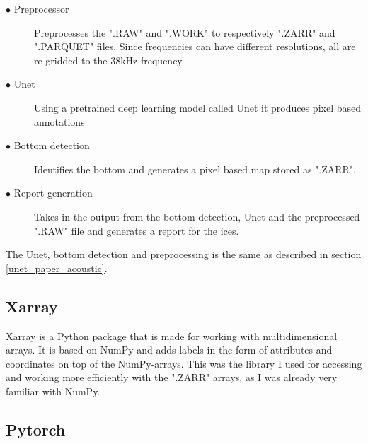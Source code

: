             \begin{description}
              \item[$\bullet$ Preprocessor] Preprocesses the ".RAW" and ".WORK" to respectively ".ZARR" and ".PARQUET" files. Since frequencies can have different resolutions, all are re-gridded to the 38kHz frequency.
              \item[$\bullet$ Unet] Using a pretrained deep learning model called Unet it produces pixel based annotations
              \item[$\bullet$ Bottom detection] Identifies the bottom and generates a pixel based map stored as ".ZARR".
              \item[$\bullet$ Report generation] Takes in the output from the bottom detection, Unet and the preprocessed ".RAW" file and generates a report for the \gls{ices}.
    
            \end{description}

        The Unet, bottom detection and preprocessing is the same as described in section \ref{unet_paper_acoustic}.

    \subsection{Xarray}
        Xarray\cite{xarray} is a Python package that is made for working with multidimensional arrays. It is based on NumPy and adds labels in the form of attributes and coordinates on top of the NumPy-arrays. This was the library I used for accessing and working more efficiently with the ".ZARR" arrays, as I was already very familiar with NumPy.
        
        
    \subsection{Pytorch} \label{Pytorch}
    
    